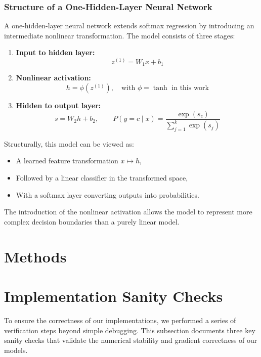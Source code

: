 \documentclass[11pt]{article}
\begin{document}
\subsubsection{Structure of a One-Hidden-Layer Neural Network}

A one-hidden-layer neural network extends softmax regression by introducing an intermediate nonlinear transformation. The model consists of three stages:

\begin{enumerate}[leftmargin=2em]
    \item \textbf{Input to hidden layer:}
    \[
        z^{(1)} = W_1 x + b_1
    \]

    \item \textbf{Nonlinear activation:}
    \[
        h = \phi(z^{(1)}), \quad \text{with } \phi = \tanh \text{ in this work}
    \]

    \item \textbf{Hidden to output layer:}
    \[
        s = W_2 h + b_2, \qquad
        P(y=c \mid x) = \frac{\exp(s_c)}{\sum_{j=1}^{k} \exp(s_j)}
    \]
\end{enumerate}

Structurally, this model can be viewed as:
\begin{itemize}[leftmargin=2em]
    \item A learned feature transformation $x \mapsto h$,
    \item Followed by a linear classifier in the transformed space,
    \item With a softmax layer converting outputs into probabilities.
\end{itemize}

The introduction of the nonlinear activation allows the model to represent more complex decision boundaries than a purely linear model.

\section{Methods}

\section{Implementation Sanity Checks}
To ensure the correctness of our implementations, we performed a series of verification steps beyond simple debugging. This subsection documents three key sanity checks that validate the numerical stability and gradient correctness of our models.
\end{document}

